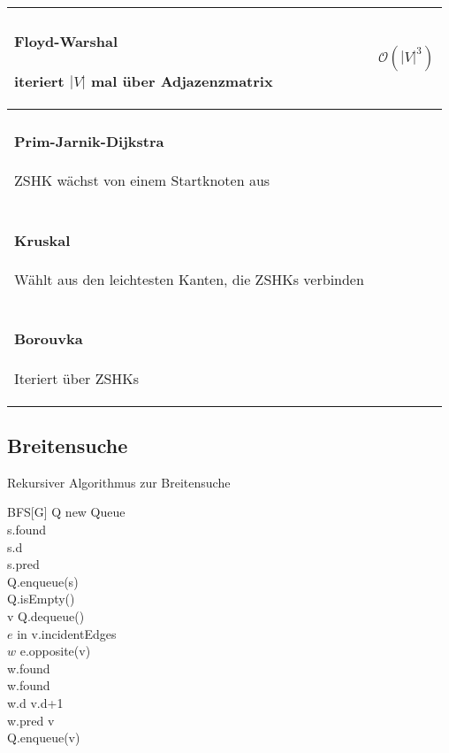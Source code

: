 \begin{center}
\begin{tabular}{|p{.4\linewidth}|p{.5\linewidth}|}
\paragraph{Floyd-Warshal}
\index{Algorithmen!Graphen!Floyd-Warshall}
iteriert $|V|$ mal über Adjazenzmatrix
&
$$\mathcal{O}(|V|^3)$$
\\\hline\hline
\paragraph{Prim-Jarnik-Dijkstra}
\index{Algorithmen!Graphen!Prim-Jarnik-Dijkstra}
ZSHK wächst von einem Startknoten aus
&
\\\hline
\paragraph{Kruskal}
\index{Algorithmen!Graphen!Kruskal}
Wählt aus den leichtesten Kanten, die ZSHKs verbinden
&
\\\hline
\paragraph{Borouvka}
\index{Algorithmen!Graphen!Borouvka}
Iteriert über ZSHKs
&
\\\hline
\end{tabular}
\end{center}

\subsection{Breitensuche}
\label{subsec:Breitensuche}

Rekursiver Algorithmus zur Breitensuche

\begin{algorithm}{BFS}[G]{
	\qinput{}
	\qoutput{}
}
Q \qlet new Queue\\ %
s.found \qlet \qtrue\\
s.d \\
s.pred \qlet \qnil\\ %
Q.enqueue(s)\\
\qwhile \qnot Q.isEmpty()\\
	v \qlet Q.dequeue()\\
	\qfor $e$ in v.incidentEdges\\
		$w$ \qlet e.opposite(v)\\
		\qif \qnot w.found\\
			\qthen
				w.found \qlet \qtrue\\
				w.d \qlet v.d+1\\
				w.pred \qlet v\\%
				Q.enqueue(v)%
		\qfi
	\qrof
\qelihw
\end{algorithm}

